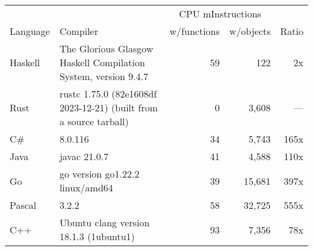 \documentclass{article}
\begin{document}
      \begin{tabularx}{\linewidth}{lXrrr}
      \toprule
        & & \multicolumn{2}{c}{CPU mInstructions} & \\
        Language & Compiler & w/functions & w/objects & Ratio \\
      \midrule
    Haskell & The Glorious Glasgow Haskell Compilation System, version 9.4.7 & 59 & 122 & 2x \\
Rust & rustc 1.75.0 (82e1608df 2023-12-21) (built from a source tarball) & 0 & 3,608 & --- \\
C\# & 8.0.116 & 34 & 5,743 & 165x \\
Java & javac 21.0.7 & 41 & 4,588 & 110x \\
Go & go version go1.22.2 linux/amd64 & 39 & 15,681 & 397x \\
Pascal & 3.2.2 & 58 & 32,725 & 555x \\
C++ & Ubuntu clang version 18.1.3 (1ubuntu1) & 93 & 7,356 & 78x \\

      \bottomrule
      \end{tabularx}
      
\end{document}
